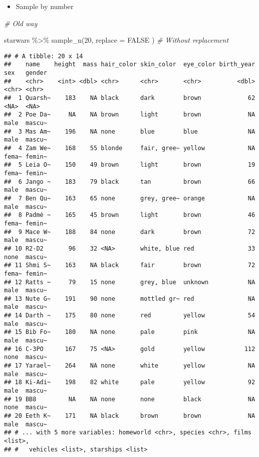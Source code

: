\documentclass[
]{book}
\newenvironment{Shaded}{\begin{snugshade}}{\end{snugshade}}
\newcommand{\AttributeTok}[1]{\textcolor[rgb]{0.77,0.63,0.00}{#1}}
\newcommand{\CommentTok}[1]{\textcolor[rgb]{0.56,0.35,0.01}{\textit{#1}}}
\newcommand{\ConstantTok}[1]{\textcolor[rgb]{0.00,0.00,0.00}{#1}}
\newcommand{\DecValTok}[1]{\textcolor[rgb]{0.00,0.00,0.81}{#1}}
\newcommand{\FunctionTok}[1]{\textcolor[rgb]{0.00,0.00,0.00}{#1}}
\newcommand{\NormalTok}[1]{#1}
\newcommand{\SpecialCharTok}[1]{\textcolor[rgb]{0.00,0.00,0.00}{#1}}
\providecommand{\tightlist}{%
  \setlength{\itemsep}{0pt}\setlength{\parskip}{0pt}}
\begin{document}
\begin{itemize}
\tightlist
\item
  Sample by number
\end{itemize}

\begin{Shaded}
\begin{Highlighting}[]
\CommentTok{\# Old way}

\NormalTok{starwars }\SpecialCharTok{\%\textgreater{}\%}
  \FunctionTok{sample\_n}\NormalTok{(}\DecValTok{20}\NormalTok{,}
    \AttributeTok{replace =} \ConstantTok{FALSE}
\NormalTok{  ) }\CommentTok{\# Without replacement}
\end{Highlighting}
\end{Shaded}

\begin{verbatim}
## # A tibble: 20 x 14
##    name    height  mass hair_color skin_color  eye_color birth_year sex   gender
##    <chr>    <int> <dbl> <chr>      <chr>       <chr>          <dbl> <chr> <chr> 
##  1 Quarsh~    183    NA black      dark        brown             62 <NA>  <NA>  
##  2 Poe Da~     NA    NA brown      light       brown             NA male  mascu~
##  3 Mas Am~    196    NA none       blue        blue              NA male  mascu~
##  4 Zam We~    168    55 blonde     fair, gree~ yellow            NA fema~ femin~
##  5 Leia O~    150    49 brown      light       brown             19 fema~ femin~
##  6 Jango ~    183    79 black      tan         brown             66 male  mascu~
##  7 Ben Qu~    163    65 none       grey, gree~ orange            NA male  mascu~
##  8 Padmé ~    165    45 brown      light       brown             46 fema~ femin~
##  9 Mace W~    188    84 none       dark        brown             72 male  mascu~
## 10 R2-D2       96    32 <NA>       white, blue red               33 none  mascu~
## 11 Shmi S~    163    NA black      fair        brown             72 fema~ femin~
## 12 Ratts ~     79    15 none       grey, blue  unknown           NA male  mascu~
## 13 Nute G~    191    90 none       mottled gr~ red               NA male  mascu~
## 14 Darth ~    175    80 none       red         yellow            54 male  mascu~
## 15 Bib Fo~    180    NA none       pale        pink              NA male  mascu~
## 16 C-3PO      167    75 <NA>       gold        yellow           112 none  mascu~
## 17 Yarael~    264    NA none       white       yellow            NA male  mascu~
## 18 Ki-Adi~    198    82 white      pale        yellow            92 male  mascu~
## 19 BB8         NA    NA none       none        black             NA none  mascu~
## 20 Eeth K~    171    NA black      brown       brown             NA male  mascu~
## # ... with 5 more variables: homeworld <chr>, species <chr>, films <list>,
## #   vehicles <list>, starships <list>
\end{verbatim}
\end{document}
